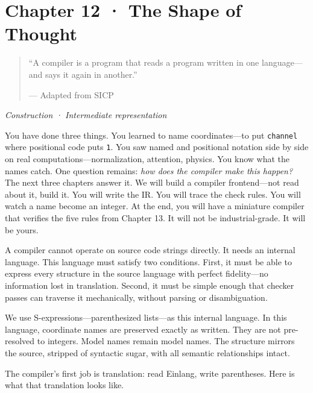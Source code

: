 \documentclass[11pt,titlepage]{article}
\begin{document}
\newpage

\hypertarget{chapter-12-the-shape-of-thought}{%
\section{Chapter 12 · The Shape of
Thought}\label{chapter-12-the-shape-of-thought}}

\begin{quote}
``A compiler is a program that reads a program written in one
language---and says it again in another.''

--- Adapted from SICP
\end{quote}

\emph{Construction · Intermediate representation}

\vspace{2em}

You have done three things. You learned to name coordinates---to put
\texttt{channel} where positional code puts \texttt{1}. You saw named
and positional notation side by side on real
computations---normalization, attention, physics. You know what the
names catch. One question remains: \emph{how does the compiler make this
happen?} The next three chapters answer it. We will build a compiler
frontend---not read about it, build it. You will write the IR. You will
trace the check rules. You will watch a name become an integer. At the
end, you will have a miniature compiler that verifies the five rules
from Chapter 13. It will not be industrial-grade. It will be yours.

\vspace{2em}

A compiler cannot operate on source code strings directly. It needs an
internal language. This language must satisfy two conditions. First, it
must be able to express every structure in the source language with
perfect fidelity---no information lost in translation. Second, it must
be simple enough that checker passes can traverse it mechanically,
without parsing or disambiguation.

We use S-expressions---parenthesized lists---as this internal language.
In this language, coordinate names are preserved exactly as written.
They are not pre-resolved to integers. Model names remain model names.
The structure mirrors the source, stripped of syntactic sugar, with all
semantic relationships intact.

The compiler's first job is translation: read Einlang, write
parentheses. Here is what that translation looks like.
\end{document}
